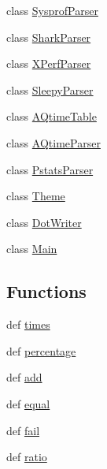 \begin{DoxyCompactItemize}
\item 
class \hyperlink{classgprof2dot_1_1SysprofParser}{SysprofParser}
\item 
class \hyperlink{classgprof2dot_1_1SharkParser}{SharkParser}
\item 
class \hyperlink{classgprof2dot_1_1XPerfParser}{XPerfParser}
\item 
class \hyperlink{classgprof2dot_1_1SleepyParser}{SleepyParser}
\item 
class \hyperlink{classgprof2dot_1_1AQtimeTable}{AQtimeTable}
\item 
class \hyperlink{classgprof2dot_1_1AQtimeParser}{AQtimeParser}
\item 
class \hyperlink{classgprof2dot_1_1PstatsParser}{PstatsParser}
\item 
class \hyperlink{classgprof2dot_1_1Theme}{Theme}
\item 
class \hyperlink{classgprof2dot_1_1DotWriter}{DotWriter}
\item 
class \hyperlink{classgprof2dot_1_1Main}{Main}
\end{DoxyCompactItemize}
\subsection*{Functions}
\begin{DoxyCompactItemize}
\item 
def \hyperlink{namespacegprof2dot_ab09acfc238bb48c2a9367a99ad646371}{times}
\item 
def \hyperlink{namespacegprof2dot_a4593a742915303b1fc39347fb781b2ef}{percentage}
\item 
def \hyperlink{namespacegprof2dot_aa203a76e6049687c1e57913af63d088b}{add}
\item 
def \hyperlink{namespacegprof2dot_ae4ff6a99d7012515570b8258416699b0}{equal}
\item 
def \hyperlink{namespacegprof2dot_aab854bd72a6622f45b68b64cdc674ba0}{fail}
\item 
def \hyperlink{namespacegprof2dot_a4c10337c274ef0696d2b44a06764bf2b}{ratio}
\end{DoxyCompactItemize}
